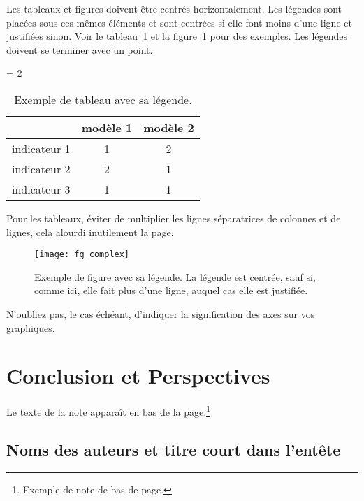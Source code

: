 \documentclass[a4paper,pagenum,french,showlayout]{rnti}
\begin{document}
Les tableaux et figures doivent être centrés horizontalement. Les
légendes sont placées sous ces mêmes éléments et sont centrées si
elle font moins d'une ligne et justifiées sinon. Voir le
tableau~\ref{tab_exemple} et la figure~\ref{fig_exemple} pour des
exemples. Les légendes doivent se terminer avec un point.



\begin{table}[ht]
 \begin{center}
   \tabcolsep = 2\tabcolsep
   \begin{tabular}{lcc}
   \hline\hline
                & modèle 1 & modèle 2 \\
   \hline
   indicateur 1 & 1        & 2        \\
   indicateur 2 & 2        & 1        \\
   indicateur 3 & 1        & 1        \\
   \hline
   \end{tabular}
\caption{Exemple de tableau avec sa légende.} \label{tab_exemple}
 \end{center}
\end{table}

Pour les tableaux, éviter de multiplier les lignes séparatrices de
colonnes et de lignes, cela alourdi inutilement la page.


\begin{figure}[t]
\begin{center}
 \texttt{[image: fg\_complex]}
 \caption{Exemple de figure avec sa légende. La légende est centrée,
sauf si, comme ici, elle fait plus d'une ligne, auquel cas elle est
justifiée.} \label{fig_exemple}
\end{center}
\end{figure}

N'oubliez pas, le cas échéant, d'indiquer la signification des axes
sur vos graphiques.


\section{Conclusion et Perspectives}

Le texte de la note apparaît en bas de la page.\footnote{Exemple de
note de bas de page.}

\subsection{Noms des auteurs et titre court dans l'entête}
\end{document}
